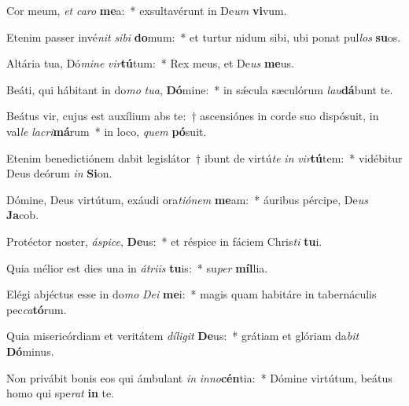 \item Cor meum, \textit{et} \textit{ca}\textit{ro} \textbf{me}a:~* exsultavérunt in De\textit{um} \textbf{vi}vum.
\item Etenim passer invé\textit{nit} \textit{si}\textit{bi} \textbf{do}mum:~* et turtur nidum sibi, ubi ponat pul\textit{los} \textbf{su}os.
\item Altária tua, Dó\textit{mi}\textit{ne} \textit{vir}\textbf{tú}tum:~* Rex meus, et De\textit{us} \textbf{me}us.
\item Beáti, qui hábitant in do\textit{mo} \textit{tu}\textit{a}, \textbf{Dó}mine:~* in sǽcula sæculórum \textit{lau}\textbf{dá}bunt te.
\item Beátus vir, cujus est auxílium abs te:~† ascensiónes in corde suo dispósuit, in val\textit{le} \textit{la}\textit{cri}\textbf{má}rum~* in loco, \textit{quem} \textbf{pó}suit.
\item Etenim benedictiónem dabit legislátor~† ibunt de virtú\textit{te} \textit{in} \textit{vir}\textbf{tú}tem:~* vidébitur Deus deórum \textit{in} \textbf{Si}on.
\item Dómine, Deus virtútum, exáudi ora\textit{ti}\textit{ó}\textit{nem} \textbf{me}am:~* áuribus pércipe, De\textit{us} \textbf{Ja}cob.
\item Protéctor noster, \textit{á}\textit{spi}\textit{ce}, \textbf{De}us:~* et réspice in fáciem Chris\textit{ti} \textbf{tu}i.
\item Quia mélior est dies una in \textit{á}\textit{tri}\textit{is} \textbf{tu}is:~* su\textit{per} \textbf{míl}lia.
\item Elégi abjéctus esse in do\textit{mo} \textit{De}\textit{i} \textbf{me}i:~* magis quam habitáre in tabernáculis pec\textit{ca}\textbf{tó}rum.
\item Quia misericórdiam et veritátem \textit{dí}\textit{li}\textit{git} \textbf{De}us:~* grátiam et glóriam da\textit{bit} \textbf{Dó}minus.
\item Non privábit bonis eos qui ámbulant \textit{in} \textit{in}\textit{no}\textbf{cén}tia:~* Dómine virtútum, beátus homo qui spe\textit{rat} \textbf{in} te.
